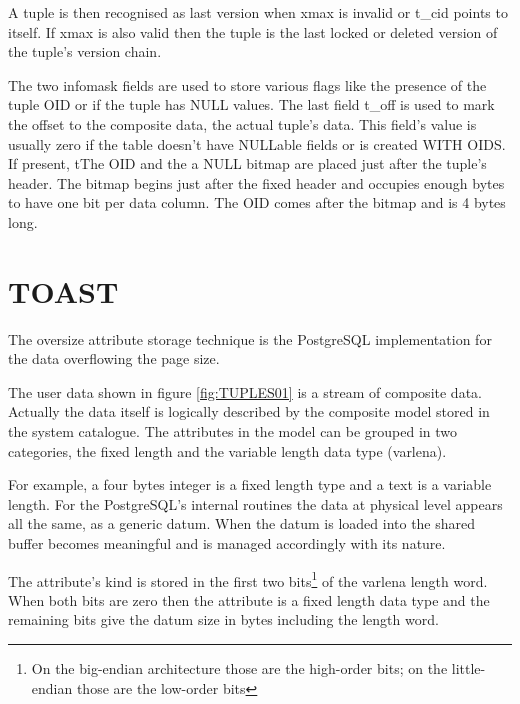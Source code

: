 A tuple is then recognised as last version when xmax is invalid or t\_cid 
points to itself. If xmax is also valid then the tuple is the last locked or 
deleted version of the tuple's version chain.\newline

The two infomask fields are used to store various flags like the presence of the tuple OID or if 
the 
tuple has NULL values.\newline
The last field t\_off is used to mark the offset to the composite data, the actual tuple's data. 
This field's value is usually zero if the table doesn't have NULLable fields or is created WITH 
OIDS. If present, tThe OID and the a NULL bitmap are placed just after the tuple's header. The 
bitmap begins just after the fixed header and occupies enough bytes to have one bit per data 
column. 
The OID comes after the bitmap and is 4 bytes long.


\section{TOAST}
\label{sec:TOAST}
The oversize attribute storage technique is the PostgreSQL implementation for the data overflowing 
the page size.\newline

The user data shown in figure \ref{fig:TUPLES01} is a stream of composite data. Actually the data 
itself is logically described by the composite model stored in the system catalogue. The attributes 
in the model can be grouped in two categories, the fixed length and the variable length data type 
(varlena).\newline

For example, a four bytes integer is a fixed length type and a text is a variable length. For the 
PostgreSQL's internal routines the data at physical level appears all the same, as a generic datum. 
When the datum is loaded into the shared buffer becomes meaningful and is managed 
accordingly with its nature.\newline

The attribute's kind is stored in the first two bits\footnote{On the big-endian architecture those 
are the high-order bits; on the little-endian those are the low-order bits} of the 
varlena length word. When both bits are zero then the attribute is a fixed length 
data type and the remaining bits give the datum size in bytes including the length word.\newline

